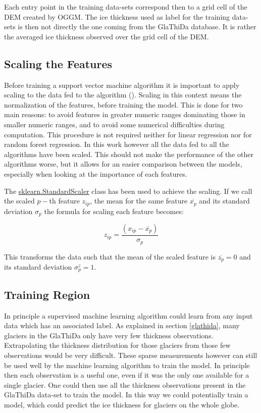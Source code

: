 Each entry point in the training data-sets correspond then to a grid cell of the DEM created by OGGM. The ice thickness used as label for the training data-sets is then not directly the one coming from the GlaThiDa database. It is rather the averaged ice thickness observed over the grid cell of the DEM.

\subsection{Scaling the Features}
Before training a support vector machine algorithm it is important to apply scaling to the data fed to the algorithm (\citet{ScalingSVM2003}). Scaling in this context means the normalization of the features, before training the model. This is done for two main reasons: to avoid features in greater numeric ranges dominating those in smaller numeric ranges, and to avoid some numerical difficulties during computation. This procedure is not required neither for linear regression nor for random forest regression. In this work however all the data fed to all the algorithms have been scaled. This should not make the performance of the other algorithms worse, but it allows for an easier comparison between the models, especially when looking at the importance of each features.

The \href{https://scikit-learn.org/stable/modules/generated/sklearn.preprocessing.StandardScaler.html}{sklearn.StandardScaler} class has been used to achieve the scaling. If we call the scaled $p-$th feature $z_{ip}$, the mean for the same feature $\overline{x_p}$ and its standard deviation $\sigma_p$ the formula for scaling each feature becomes:

\begin{equation}\label{eq:scale}
z_{ip} = \frac{(x_{ip} - \overline{x_p})}{\sigma_p}
\end{equation}

This transforms the data such that the mean of the scaled feature is $\overline{z_p}=0$ and its standard deviation $\sigma^z_p=1$.

\subsection{Training Region}\label{alps}
In principle a supervised machine learning algorithm could learn from any input data which has an associated label. As explained in section \ref{glathida}, many glaciers in the GlaThiDa only have very few thickness observations. Extrapolating the thickness distribution for those glaciers from those few observations would be very difficult. These sparse measurements however can still be used well by the machine learning algorithm to train the model. In principle then each observation is a useful one, even if it was the only one available for a single glacier. One could then use all the thickness observations present in the GlaThiDa data-set to train the model. In this way we could potentially train a model, which could predict the ice thickness for glaciers on the whole globe.

